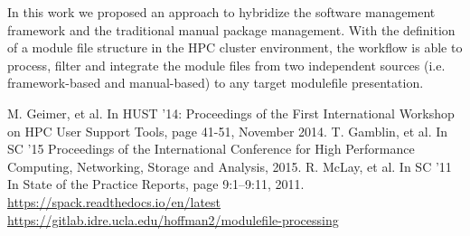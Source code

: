 \documentclass[conference]{IEEEtran}
\begin{document}
In this work we proposed an approach to hybridize the software management framework and the traditional manual package management.
With the definition of a module file structure in the HPC cluster environment, the workflow is able to process, filter and integrate the module files from two independent sources (i.e. framework-based and manual-based) to any target modulefile presentation. 

\begin{thebibliography}{00}
 M. Geimer, et al. In HUST '14: Proceedings of the First International Workshop on HPC User Support Tools, page 41-51, November 2014.
 T. Gamblin, et al. In SC ’15 Proceedings of the International Conference for High Performance Computing, Networking, Storage and Analysis, 2015.
 R. McLay, et al. In SC ’11 In State of the Practice Reports, page 9:1–9:11, 2011.
 \href{https://spack.readthedocs.io/en/latest}{https://spack.readthedocs.io/en/latest}
 \href{https://gitlab.idre.ucla.edu/hoffman2/modulefile-processing}{https://gitlab.idre.ucla.edu/hoffman2/modulefile-processing}
\end{thebibliography}
\end{document}
